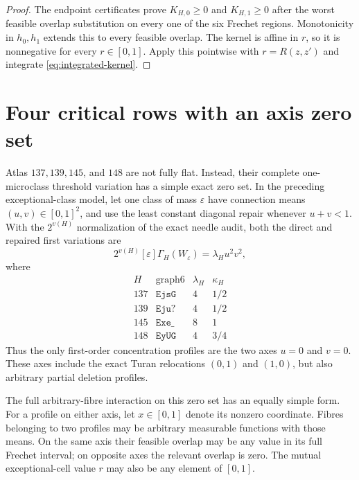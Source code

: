 \documentclass[11pt]{article}
\begin{document}
\begin{proof}
The endpoint certificates prove $K_{H,0}\geq0$ and $K_{H,1}\geq0$ after
the worst feasible overlap substitution on every one of the six Frechet
regions.  Monotonicity in $h_0,h_1$ extends this to every feasible overlap.
The kernel is affine in $r$, so it is nonnegative for every
$r\in[0,1]$.  Apply this pointwise with $r=R(z,z')$ and integrate
\eqref{eq:integrated-kernel}.
\end{proof}

\section{Four critical rows with an axis zero set}

Atlas $137,139,145$, and $148$ are not fully flat.  Instead, their complete
one-microclass threshold variation has a simple exact zero set.  In the
preceding exceptional-class model, let one class of mass $\varepsilon$ have connection
means $(u,v)\in[0,1]^2$, and use the least constant diagonal repair whenever
$u+v<1$.  With the $2^{v(H)}$ normalization of the exact needle audit, both
the direct and repaired first variations are
\begin{equation}
 2^{v(H)}[\varepsilon]\Gamma_H(W_\varepsilon)
 =\lambda_Hu^2v^2,
 \label{eq:axis-needle}
\end{equation}
where
\[
\begin{array}{c|c|c|c}
H&\text{graph6}&\lambda_H&\kappa_H\\ \hline
137&\texttt{EjsG}&4&1/2\\
139&\texttt{Eju?}&4&1/2\\
145&\texttt{Exe\_}&8&1\\
148&\texttt{EyUG}&4&3/4
\end{array}
\]
Thus the only first-order concentration profiles are the two axes $u=0$ and
$v=0$.  These axes include the exact Turan relocations $(0,1)$ and $(1,0)$,
but also arbitrary partial deletion profiles.

The full arbitrary-fibre interaction on this zero set has an equally simple
form.  For a profile on either axis, let $x\in[0,1]$ denote its nonzero
coordinate.  Fibres belonging to two profiles may be arbitrary measurable
functions with those means.  On the same axis their feasible overlap may be
any value in its full Frechet interval; on opposite axes the relevant overlap
is zero.  The mutual exceptional-cell value $r$ may also be any element of
$[0,1]$.
\end{document}
